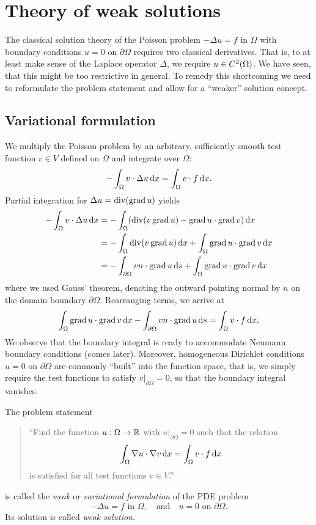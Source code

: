 \section{Theory of weak solutions}

The classical solution theory of the Poisson problem \(-\Delta u = f\) in \(\Omega\) with boundary conditions \(u = 0\) on \(\partial\Omega\) requires two classical derivatives.
That is, to at least make sense of the Laplace operator \(\Delta\), we require \(u \in C^2\parentheses*{\Omega}\).
We have seen, that this might be too restrictive in general.
To remedy this shortcoming we need to reformulate the problem statement and allow for a ``weaker'' solution concept.


\subsection{Variational formulation}

We multiply the Poisson problem by an arbitrary, sufficiently smooth test function \(v \in V\) defined on \(\Omega\) and integrate over \(\Omega\):
\[
	-\int_\Omega v \cdot \Delta u\mathop{\mathrm{d}\!} x = \int_\Omega v \cdot f\mathop{\mathrm{d}\!} x.
\]
Partial integration for \(\Delta u = \div\parentheses*{\grad u}\) yields
\begin{align*}
	-\int_\Omega v \cdot \Delta u\d x &= -\int_\Omega \parentheses*{\div\parentheses*{v\grad u} - \grad u \cdot \grad v}\d x\\
	&= -\int_\Omega \div\parentheses*{v\grad u}\d x + \int_\Omega \grad u \cdot \grad v\d x\\
	&= -\int_{\partial\Omega}vn \cdot \grad u\d s + \int_\Omega \grad u \cdot \grad v\d x
\end{align*}
where we used Gauss' theorem, denoting the outward pointing normal by \(n\) on the domain boundary \(\partial\Omega\).
Rearranging terms, we arrive at
\[
	\int_\Omega \operatorname{grad} u \cdot \operatorname{grad} v\mathop{\mathrm{d}\!} x - \int_{\partial\Omega}vn \cdot \operatorname{grad} u\mathop{\mathrm{d}\!} s = \int_\Omega v \cdot f\mathop{\mathrm{d}\!} x.
\]
We observe that the boundary integral is ready to accommodate Neumann boundary conditions (comes later).
Moreover, homogeneous Dirichlet conditions \(u = 0\) on \(\partial\Omega\) are commonly ``built'' into the function space, that is, we simply require the test functions to satisfy \(\left.v\right|_{\partial\Omega} = 0\), so that the boundary integral vanishes.

\begin{definition}
	The problem statement
	\begin{quote}
		``Find the function \(u: \Omega \to \mathbb{R}\) with \(\left.u\right|_{\partial\Omega} = 0\) such that the relation
		\[
			\int_\Omega \nabla u \cdot \nabla v\mathop{\mathrm{d}\!} x = \int_\Omega v \cdot f\mathop{\mathrm{d}\!} x
		\]
		is satisfied for all test functions \(v \in V\).''
	\end{quote}
	is called the \emph{weak} or \emph{variational formulation} of the PDE problem
	\[
		-\Delta u = f\text{ in }\Omega, \quad \text{and} \quad u = 0\text{ on }\partial\Omega.
	\]
	Its solution is called \emph{weak solution}.
\end{definition}

